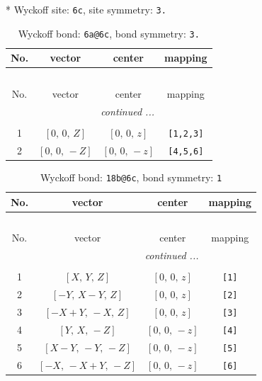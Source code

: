 \documentclass[fleqn,8pt]{jsarticle}
\begin{document}
* Wyckoff site: {\tt 6c}, site symmetry: {\tt 3.}
\renewcommand{\arraystretch}{1.2}
\begin{longtable}{cccc}
\caption{Wyckoff bond: {\tt 6a@6c}, bond symmetry: {\tt 3.}}
 \\
 \hline \hline
No. & vector & center & mapping \\ \hline \endfirsthead

\multicolumn{3}{l}{\tablename\ \thetable{}} \\
 \hline \hline
No. & vector & center & mapping \\ \hline \endhead

 \hline \hline
\multicolumn{3}{r}{\footnotesize\it continued ...} \\ \endfoot

 \hline \hline
\multicolumn{3}{r}{} \\ \endlastfoot

1 & $\left[ 0,\, 0,\, Z \right]$ & $\left[ 0,\, 0,\, z \right]$ & {\tt [1,2,3]} \\ \hline
2 & $\left[ 0,\, 0,\, - Z \right]$ & $\left[ 0,\, 0,\, - z \right]$ & {\tt [4,5,6]} \\
\end{longtable}
\renewcommand{\arraystretch}{1.2}
\begin{longtable}{cccc}
\caption{Wyckoff bond: {\tt 18b@6c}, bond symmetry: {\tt 1}}
 \\
 \hline \hline
No. & vector & center & mapping \\ \hline \endfirsthead

\multicolumn{3}{l}{\tablename\ \thetable{}} \\
 \hline \hline
No. & vector & center & mapping \\ \hline \endhead

 \hline \hline
\multicolumn{3}{r}{\footnotesize\it continued ...} \\ \endfoot

 \hline \hline
\multicolumn{3}{r}{} \\ \endlastfoot

1 & $\left[ X,\, Y,\, Z \right]$ & $\left[ 0,\, 0,\, z \right]$ & {\tt [1]} \\ \hline
2 & $\left[ - Y,\, X - Y,\, Z \right]$ & $\left[ 0,\, 0,\, z \right]$ & {\tt [2]} \\ \hline
3 & $\left[ - X + Y,\, - X,\, Z \right]$ & $\left[ 0,\, 0,\, z \right]$ & {\tt [3]} \\ \hline
4 & $\left[ Y,\, X,\, - Z \right]$ & $\left[ 0,\, 0,\, - z \right]$ & {\tt [4]} \\ \hline
5 & $\left[ X - Y,\, - Y,\, - Z \right]$ & $\left[ 0,\, 0,\, - z \right]$ & {\tt [5]} \\ \hline
6 & $\left[ - X,\, - X + Y,\, - Z \right]$ & $\left[ 0,\, 0,\, - z \right]$ & {\tt [6]} \\
\end{longtable}
\end{document}
